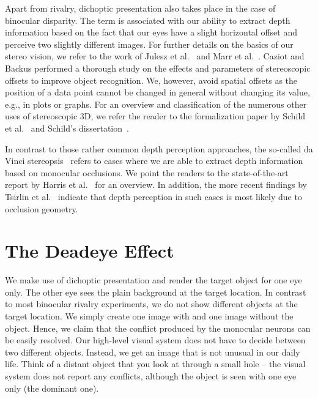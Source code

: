 \documentclass[journal]{vgtc}                %
\begin{document}
Apart from rivalry, dichoptic presentation also takes place in the case of binocular disparity. The term is associated with our ability to extract depth information based on the fact that our eyes have a slight horizontal offset and perceive two slightly different images. For further details on the basics of our stereo vision, we refer to the work of Julesz et al.~\cite{julesz1960binocular, julesz1971foundations} and Marr et al.~\cite{marr1976cooperative, marr1979computational}. Caziot and Backus\cite{Caziot:2015:SOM} performed a thorough study on the effects and parameters of stereoscopic offsets to improve object recognition. We, however, avoid spatial offsets as the position of a data point cannot be changed in general without changing its value, e.g., in plots or graphs. For an overview and classification of the numerous other uses of stereoscopic 3D, we refer the reader to the formalization paper by Schild et al.~\cite{Schild:2015:FPS} and Schild's dissertation~\cite{Schild:2014:DGC}. 

In contrast to those rather common depth perception approaches, the so-called da Vinci stereopsis~\cite{NAKAYAMA19901811} refers to cases where we are able to extract depth information based on monocular occlusions. We point the readers to the state-of-the-art report by Harris et al.~\cite{harris2009role} for an overview. In addition, the more recent findings by Tsirlin et al.~\cite{tsirlin2012vinci} indicate that depth perception in such cases is most likely due to occlusion geometry.



\section{The Deadeye Effect}



We make use of dichoptic presentation and render the target object for one eye only. The other eye sees the plain background at the target location. In contrast to most binocular rivalry experiments, we do not show different objects at the target location. We simply create one image with and one image without the object. Hence, we claim that the conflict produced by the monocular neurons can be easily resolved. Our high-level visual system does not have to decide between two different objects. Instead, we get an image that is not unusual in our daily life. Think of a distant object that you look at through a small hole -- the visual system does not report any conflicts, although the object is seen with one eye only (the dominant one). 
\end{document}
